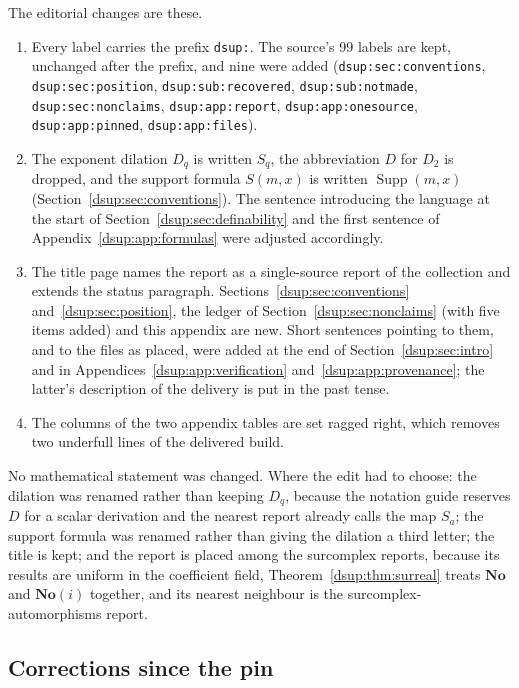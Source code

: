 \documentclass[11pt,oneside]{article}
\numberwithin{equation}{section}
\theoremstyle{definition}
\theoremstyle{remark}
\newcommand{\No}{\mathbf{No}}
\DeclareMathOperator{\Supp}{Supp}
\begin{document}
The editorial changes are these.
\begin{enumerate}[label=(\arabic*)]
\item Every label carries the prefix \texttt{dsup:}. The source's 99 labels
are kept, unchanged after the prefix, and nine were added
(\texttt{dsup:sec:conventions}, \texttt{dsup:sec:position},
\texttt{dsup:sub:recovered}, \texttt{dsup:sub:notmade},
\texttt{dsup:sec:nonclaims}, \texttt{dsup:app:report},
\texttt{dsup:app:onesource}, \texttt{dsup:app:pinned},
\texttt{dsup:app:files}).
\item The exponent dilation $D_q$ is written $S_q$, the abbreviation $D$ for
$D_2$ is dropped, and the support formula $S(m,x)$ is written $\Supp(m,x)$
(Section~\ref{dsup:sec:conventions}). The sentence introducing the language
at the start of Section~\ref{dsup:sec:definability} and the first sentence of
Appendix~\ref{dsup:app:formulas} were adjusted accordingly.
\item The title page names the report as a single-source report of the
collection and extends the status paragraph. Sections~\ref{dsup:sec:conventions}
and~\ref{dsup:sec:position}, the ledger of Section~\ref{dsup:sec:nonclaims}
(with five items added) and this appendix are new. Short sentences pointing
to them, and to the files as placed, were added at the end of
Section~\ref{dsup:sec:intro} and in Appendices~\ref{dsup:app:verification}
and~\ref{dsup:app:provenance}; the latter's description of the delivery is
put in the past tense.
\item The columns of the two appendix tables are set ragged right, which
removes two underfull lines of the delivered build.
\end{enumerate}
No mathematical statement was changed. Where the edit had to choose: the
dilation was renamed rather than keeping $D_q$, because the notation guide
reserves $D$ for a scalar derivation and the nearest report already calls
the map $S_a$; the support formula was renamed rather than giving the
dilation a third letter; the title is kept; and the report is placed among
the surcomplex reports, because its results are uniform in the coefficient
field, Theorem~\ref{dsup:thm:surreal} treats $\No$ and $\No(i)$ together,
and its nearest neighbour is the surcomplex-automorphisms report.

\subsection{Corrections since the pin}\label{dsup:app:pinned}
\end{document}

